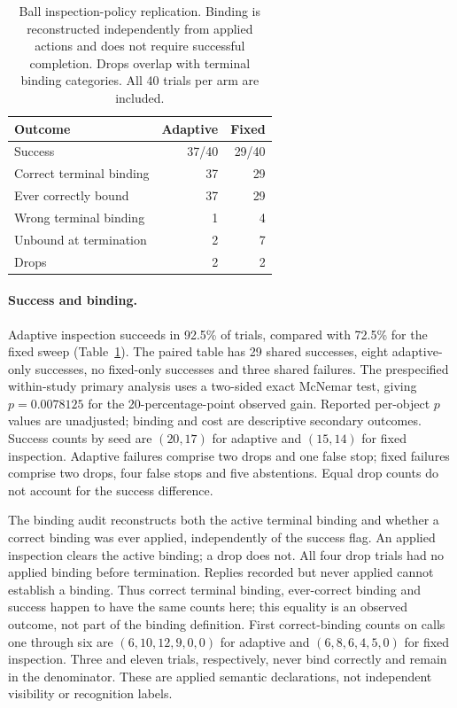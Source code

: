 \begin{table}[t]
\centering\small
\setlength{\tabcolsep}{4pt}
\begin{tabular}{lrr}
\toprule
Outcome & Adaptive & Fixed\\
\midrule
Success & 37/40 & 29/40\\
Correct terminal binding & 37 & 29\\
Ever correctly bound & 37 & 29\\
Wrong terminal binding & 1 & 4\\
Unbound at termination & 2 & 7\\
Drops & 2 & 2\\
\bottomrule
\end{tabular}
\caption{Ball inspection-policy replication. Binding is reconstructed independently from applied actions and does not require successful completion. Drops overlap with terminal binding categories. All 40 trials per arm are included.}
\label{tab:inspection-policy-ball}
\end{table}

\paragraph{Success and binding.}
Adaptive inspection succeeds in 92.5\% of trials, compared with 72.5\% for the fixed sweep (Table~\ref{tab:inspection-policy-ball}). The paired table has 29 shared successes, eight adaptive-only successes, no fixed-only successes and three shared failures. The prespecified within-study primary analysis uses a two-sided exact McNemar test, giving $p=0.0078125$ for the 20-percentage-point observed gain. Reported per-object $p$ values are unadjusted; binding and cost are descriptive secondary outcomes. Success counts by seed are $(20,17)$ for adaptive and $(15,14)$ for fixed inspection. Adaptive failures comprise two drops and one false stop; fixed failures comprise two drops, four false stops and five abstentions. Equal drop counts do not account for the success difference.

The binding audit reconstructs both the active terminal binding and whether a correct binding was ever applied, independently of the success flag. An applied inspection clears the active binding; a drop does not. All four drop trials had no applied binding before termination. Replies recorded but never applied cannot establish a binding. Thus correct terminal binding, ever-correct binding and success happen to have the same counts here; this equality is an observed outcome, not part of the binding definition. First correct-binding counts on calls one through six are $(6,10,12,9,0,0)$ for adaptive and $(6,8,6,4,5,0)$ for fixed inspection. Three and eleven trials, respectively, never bind correctly and remain in the denominator. These are applied semantic declarations, not independent visibility or recognition labels.

